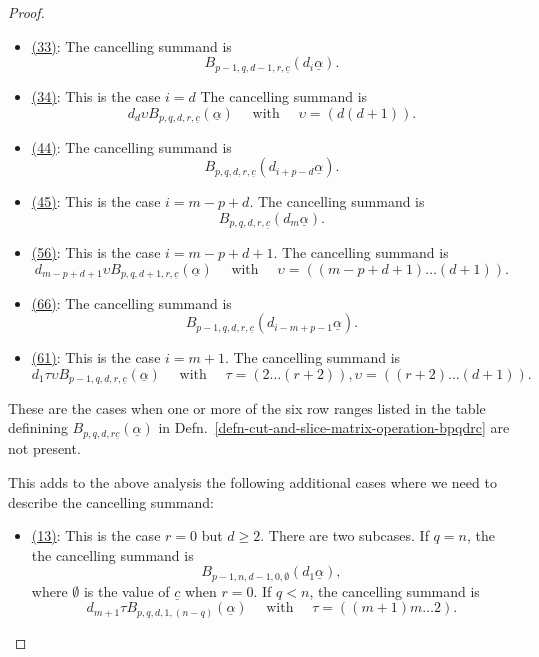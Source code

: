 \documentclass[10pt,a4paper]{amsart}
\begin{document}
\begin{proof}
\begin{itemize}
\item \underline{(33)}: The cancelling summand is 
$$ B_{p-1, q, d-1, r, \underline{c}} (d_i \underline{\alpha}). $$

\item \underline{(34)}: This is the case $i=d$ The cancelling summand is 
$$ d_d \upsilon B_{p, q, d, r, \underline{c}} (\underline{\alpha})
\quad \text{ with } \quad \upsilon = \left(d(d+1)\right). $$

\item \underline{(44)}: The cancelling summand is 
$$ B_{p, q, d, r, \underline{c}} (d_{i + p - d} \underline{\alpha}).$$

\item \underline{(45)}: This is the case $i = m-p+d$. 
The cancelling summand is 
$$ B_{p, q, d, r, \underline{c}} (d_{m} \underline{\alpha}).$$

\item \underline{(56)}: This is the case $i = m-p+d+1$. 
The cancelling summand is 
$$ d_{m-p+d+1} \upsilon B_{p, q, d+1, r, \underline{c}} (\underline{\alpha})
\quad \text{ with } \quad \upsilon = \left((m-p+d+1)\dots(d+1)\right). $$

\item \underline{(66)}: The cancelling summand is 
$$ B_{p-1, q, d, r, \underline{c}} (d_{i-m+p-1} \underline{\alpha}).$$

\item \underline{(61)}: This is the case $i = m+1$. 
The cancelling summand is 
$$ d_1 \tau \upsilon B_{p-1, q, d, r, \underline{c}} (\underline{\alpha})
\quad \text{ with } \quad 
\tau = \left(2\dots(r+2)\right),
\upsilon = \left((r+2)\dots(d+1)\right). $$
\end{itemize}


These are the cases when one or more of the six row
ranges listed in the table definining $B_{p, q, d, r
\underline{c}}(\underline{\alpha})$ in
Defn.~\ref{defn-cut-and-slice-matrix-operation-bpqdrc} are not
present. 

This adds to the above analysis the following additional cases 
where we need to describe the cancelling summand: 

\begin{itemize}
\item \underline{(13)}: This is the case $r = 0$ but $d \geq 2$. 
There are two subcases. If $q = n$, the the cancelling summand is  
$$B_{p-1, n, d-1, 0,\emptyset}(d_1 \underline{\alpha}),$$
where $\emptyset$ is the value of $\underline{c}$ when $r=0$. 
If $q < n$, the cancelling summand is
$$
d_{m+1} \tau B_{p, q, d, 1, (n-q)}(\underline{\alpha})
\quad \text{ with } \quad \tau = \left((m+1)m\dots2\right).$$


\end{itemize}
\end{proof}
\end{document}
